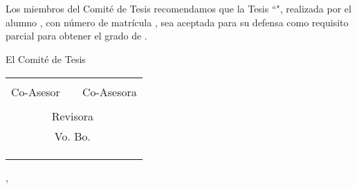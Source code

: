 \begin{center}
{\bf \large \uanl} \\
{\bf \fime} \\
{\bf \depg}
\end{center}
\vskip 4mm
\vspace*{-6mm}

Los miembros del Comité de Tesis recomendamos que la Tesis ``\titulo", realizada por el alumno \autor, con número de matrícula \matricula, sea aceptada para su defensa como requisito parcial para obtener el grado de \grado\orientacion.
\vskip 10mm
\ifdoctorado{\vskip 10mm}\else{\vskip 8mm}\fi

\begin{center}
\vspace*{-10mm}
El Comité de Tesis\\
\vskip 20mm
\begin{tabular}{p{20mm}p{20mm}p{2mm}p{20mm}p{20mm}}
	\cline{1-2} \cline{4-5}
	\multicolumn{2}{c}{\asesor} & & \multicolumn{2}{c}{\revisorA} \\
	\multicolumn{2}{c}{Co-Asesor} & & \multicolumn{2}{c}{Co-Asesora} \\[17mm]
	\cline{2-4}
	& \multicolumn{3}{c}{\revisorB} & \\
	& \multicolumn{3}{c}{Revisora}  & \\[15mm]
	& \multicolumn{3}{c}{Vo. Bo.} & \\[15mm]
	\cline{2-4}
	& \multicolumn{3}{c}{\vobo}   & \\
	& \multicolumn{3}{c}{\depgr}   & \\ &&&&
\end{tabular}
\vfill
\snnl, \MakeLowercase{\fecha}

\end{center}
